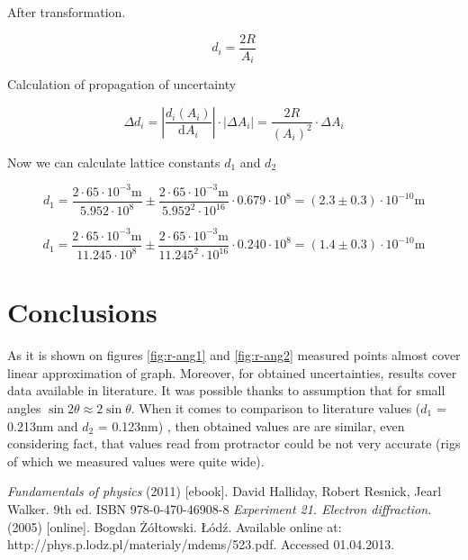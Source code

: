 \documentclass[a4paper,12pt]{article}
\begin{document}
After transformation.

\begin{equation}
    d_i = \frac{2R}{A_i}
\end{equation}

Calculation of propagation of uncertainty

\begin{equation}
    \Delta d_i = \left|\frac{d_i(A_i)}{\mathrm{d} A_i}\right| \cdot |\Delta A_i| = \frac{2R}{(A_i)^2} \cdot \Delta A_i   
\end{equation}


Now we can calculate lattice constants $d_1$ and $d_2$

\begin{displaymath}
    d_1 = \frac{2\cdot 65 \cdot 10^{-3} \mathrm{m}}{5.952 \cdot 10^{8}} \pm  \frac{2\cdot 65 \cdot 10^{-3} \mathrm{m}}{5.952^2 \cdot 10^{16}} \cdot 0.679 \cdot 10^8  = (2.3 \pm 0.3) \cdot 10^{-10}\mathrm{m} 
\end{displaymath}


\begin{displaymath}
    d_1 = \frac{2\cdot 65 \cdot 10^{-3} \mathrm{m}}{11.245 \cdot 10^{8}} \pm  \frac{2\cdot 65 \cdot 10^{-3} \mathrm{m}}{11.245^2 \cdot 10^{16}} \cdot 0.240 \cdot 10^8  = (1.4 \pm 0.3) \cdot 10^{-10}\mathrm{m} 
\end{displaymath}

\section{Conclusions}
As it is shown on figures \ref{fig:r-ang1} and \ref{fig:r-ang2} measured points almost cover linear approximation of graph. Moreover, for obtained uncertainties, results cover data available in literature. It was possible thanks to assumption that for small angles $\sin 2 \theta \approx 2 \sin \theta$. When it comes to comparison to literature values ($d_1$ = 0.213nm and $d_2$ = 0.123nm) \cite{E21}, then obtained values are are similar, even considering fact, that values read from protractor could be not very accurate (rigs of which we measured values were quite wide). 


\begin{thebibliography}{9}
    \emph{Fundamentals of physics} (2011) [ebook]. David Halliday, Robert Resnick, Jearl Walker. 9th ed. ISBN 978-0-470-46908-8
    \emph{Experiment 21. Electron diffraction.} (2005) [online]. Bogdan Żółtowski. Łódź. Available online at: http://phys.p.lodz.pl/materialy/mdems/523.pdf. Accessed 01.04.2013.
\end{thebibliography}
\end{document}
